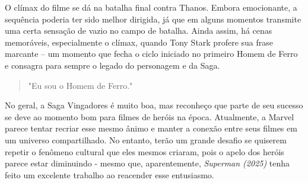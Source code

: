 \documentclass[
    12pt,                  %
    openright,             %
    oneside,               %
    a4paper,               %
    chapter=TITLE,         %
    section=TITLE,         %
    brazil                 %
]{abntex2}                 %
\begin{document}
\noindent O clímax do filme se dá na batalha final contra Thanos. Embora emocionante, a sequência poderia ter sido melhor dirigida, já que em alguns momentos transmite uma certa sensação de vazio no campo de batalha. Ainda assim, há cenas memoráveis, especialmente o clímax, quando Tony Stark profere sua frase marcante – um momento que fecha o ciclo iniciado no primeiro Homem de Ferro e consagra para sempre o legado do personagem e da Saga.\\

\begin{quote} \center
    "Eu sou o Homem de Ferro."
\end{quote}
\flushleft

No geral, a Saga Vingadores é muito boa, mas reconheço que parte de seu sucesso se deve ao momento bom para filmes de heróis na época. Atualmente, a Marvel parece tentar recriar esse mesmo ânimo e manter a conexão entre seus filmes em um universo compartilhado. No entanto, terão um grande desafio se quiserem repetir o fenômeno cultural que eles mesmos criaram, pois o apelo dos heróis parece estar diminuindo - mesmo que, aparentemente, \textit{Superman (2025)} tenha feito um excelente trabalho ao reacender esse entusiasmo.
\end{document}
